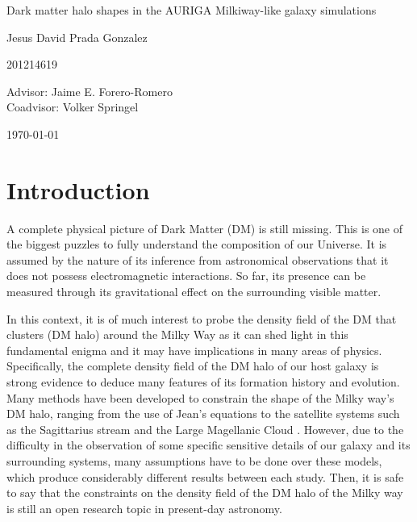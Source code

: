 \documentclass[12pt]{article}
\begin{document}
\begin{center}
\Huge
Dark matter halo shapes in the AURIGA Milkiway-like galaxy simulations

\vspace{3mm}
\Large Jesus David Prada Gonzalez

\large
201214619


\vspace{2mm}
\Large
Advisor: Jaime E. Forero-Romero\\
Coadvisor: Volker Springel
\normalsize
\vspace{2mm}

\today
\end{center}


\normalsize
\section{Introduction}


A complete physical picture of Dark Matter (DM) is still missing.
This is one of the biggest puzzles to fully understand the composition of our Universe.
It is assumed by the nature of its inference from astronomical observations that it does not possess electromagnetic interactions.
So far, its presence can be measured through its gravitational effect on the surrounding visible matter. 

In this context, it is of much interest to probe the density field of the DM that clusters (DM halo) around the Milky Way 
as it can shed light in this fundamental enigma and it may have implications in many areas of physics. Specifically, the complete density field of the DM halo of our host galaxy is strong evidence to deduce many features of its formation history and evolution.\\

Many methods have been developed to constrain the shape of the Milky way's DM halo, ranging from the use of Jean's equations \cite{Loebman et al. 2012} to the satellite systems such as the Sagittarius stream and the Large Magellanic Cloud \cite{Vera-Ciro et al 2013, Deg & Widrow 2012, Law & Majewski 2010}. However, due to the difficulty in the observation of some specific sensitive details of our galaxy and its surrounding systems, many assumptions have to be done over these models, which produce considerably different results between each study. Then, it is safe to say that the constraints on the density field of the DM halo of the Milky way is still an open research topic in present-day astronomy. \\
\end{document}
